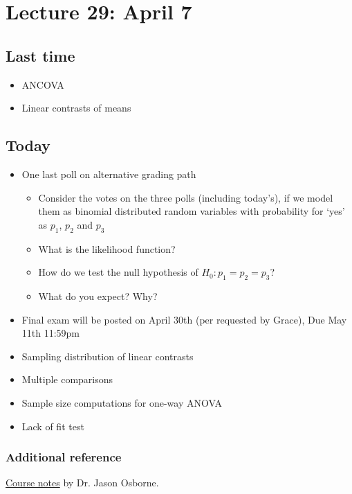 \setcounter{section}{28}

\section{Lecture 29: April 7}


\subsection*{Last time}
\begin{itemize}
	\item ANCOVA
	\item Linear contrasts of means
\end{itemize}


\subsection*{Today}
\begin{itemize}
	\item One last poll on alternative grading path
	\begin{itemize}
		\item Consider the votes on the three polls (including today's), if we model them as binomial distributed random variables with probability for `yes' as $p_1$, $p_2$ and $p_3$
		\item What is the likelihood function?
		\item How do we test the null hypothesis of $H_0: p_1 = p_2 = p_3$?
		\item What do you expect?  Why?
	\end{itemize}
	\item Final exam will be posted on April 30th (per requested by Grace), Due May 11th 11:59pm
	\item Sampling distribution of linear contrasts
	\item Multiple comparisons
	\item Sample size computations for one-way ANOVA	
	\item Lack of fit test	
\end{itemize}

\subsubsection*{Additional reference}
\href{https://www4.stat.ncsu.edu/~osborne/st512r/handouts/allpackets.pdf}{Course notes} by Dr. Jason Osborne.

